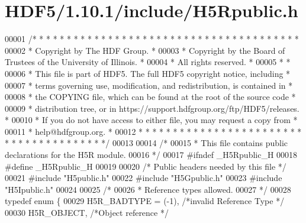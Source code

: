 \hypertarget{_h_d_f5_21_810_81_2include_2_h5_rpublic_8h_source}{}\section{H\+D\+F5/1.10.1/include/\+H5\+Rpublic.h}
\label{_h_d_f5_21_810_81_2include_2_h5_rpublic_8h_source}

\begin{DoxyCode}
00001 \textcolor{comment}{/* * * * * * * * * * * * * * * * * * * * * * * * * * * * * * * * * * * * * * *}
00002 \textcolor{comment}{ * Copyright by The HDF Group.                                               *}
00003 \textcolor{comment}{ * Copyright by the Board of Trustees of the University of Illinois.         *}
00004 \textcolor{comment}{ * All rights reserved.                                                      *}
00005 \textcolor{comment}{ *                                                                           *}
00006 \textcolor{comment}{ * This file is part of HDF5.  The full HDF5 copyright notice, including     *}
00007 \textcolor{comment}{ * terms governing use, modification, and redistribution, is contained in    *}
00008 \textcolor{comment}{ * the COPYING file, which can be found at the root of the source code       *}
00009 \textcolor{comment}{ * distribution tree, or in https://support.hdfgroup.org/ftp/HDF5/releases.  *}
00010 \textcolor{comment}{ * If you do not have access to either file, you may request a copy from     *}
00011 \textcolor{comment}{ * help@hdfgroup.org.                                                        *}
00012 \textcolor{comment}{ * * * * * * * * * * * * * * * * * * * * * * * * * * * * * * * * * * * * * * */}
00013 
00014 \textcolor{comment}{/*}
00015 \textcolor{comment}{ * This file contains public declarations for the H5R module.}
00016 \textcolor{comment}{ */}
00017 \textcolor{preprocessor}{#ifndef \_H5Rpublic\_H}
00018 \textcolor{preprocessor}{#define \_H5Rpublic\_H}
00019 
00020 \textcolor{comment}{/* Public headers needed by this file */}
00021 \textcolor{preprocessor}{#include "H5public.h"}
00022 \textcolor{preprocessor}{#include "H5Gpublic.h"}
00023 \textcolor{preprocessor}{#include "H5Ipublic.h"}
00024 
00025 \textcolor{comment}{/*}
00026 \textcolor{comment}{ * Reference types allowed.}
00027 \textcolor{comment}{ */}
00028 \textcolor{keyword}{typedef} \textcolor{keyword}{enum} \{
00029     H5R\_BADTYPE     =   (-1),   \textcolor{comment}{/*invalid Reference Type                     */}
00030     H5R\_OBJECT,                 \textcolor{comment}{/*Object reference                           */}

\end{DoxyCode}
